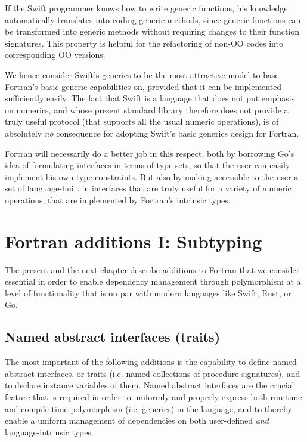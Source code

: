 \documentclass[11pt,oneside]{report}
\newcommand{\code}[1]{{\selectfont\ttfamily{#1}}}
\begin{document}
If the Swift programmer knows how to write generic functions, his
knowledge automatically translates into coding generic methods, since
generic functions can be transformed into generic methods without
requiring changes to their function signatures. This property is
helpful for the refactoring of non-OO codes into corresponding OO
versions.

We hence consider Swift's generics to be the most attractive model to
base Fortran's basic generic capabilities on, provided that it can be
implemented sufficiently easily. The fact that Swift is a language
that does not put emphasis on numerics, and whose present standard
library therefore does not provide a truly useful \code{Numeric}
protocol (that supports all the usual numeric operations), is of
absolutely \emph{no} consequence for adopting Swift's basic generics
design for Fortran.

Fortran will necessarily do a better job in this respect, both by
borrowing Go's idea of formulating interfaces in terms of type sets,
so that the user can easily implement his own type constraints. But
also by making accessible to the user a set of language-built in
interfaces that are truly useful for a variety of numeric operations,
that are implemented by Fortran's intrinsic types.


\chapter{Fortran additions I: Subtyping}

The present and the next chapter describe additions to Fortran that we
consider essential in order to enable dependency management through
polymorphism at a level of functionality that is on par with modern
languages like Swift, Rust, or Go.

\section{Named abstract interfaces (traits)}

The most important of the following additions is the capability to
define named abstract interfaces, or traits (i.e. named collections of
procedure signatures), and to declare instance variables of
them. Named abstract interfaces are the crucial feature that is
required in order to uniformly and properly express both run-time and
compile-time polymorphism (i.e. generics) in the language, and to
thereby enable a uniform management of dependencies on both
user-defined \emph{and} language-intrinsic types.
\end{document}
